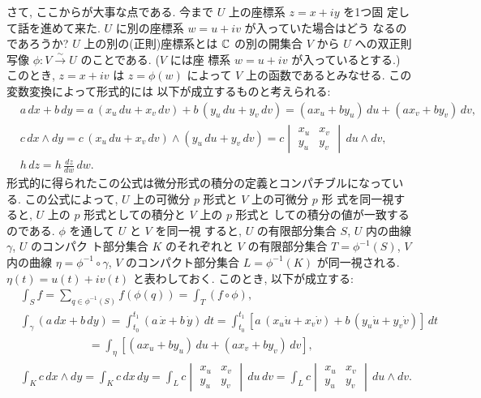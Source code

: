 \documentclass[12pt,twoside]{jarticle}
\def\C{{\Bbb C}} %
\def\isoto{\overset\sim\longrightarrow}
\def\od#1#2{\frac{d #1}{d #2}}
\begin{document}
さて, ここからが大事な点である. 今まで $U$ 上の座標系 $z=x+iy$ を1つ固
定して話を進めて来た. $U$ に別の座標系 $w=u+iv$ が入っていた場合はどう
なるのであろうか? $U$ 上の別の(正則)座標系とは $\C$ の別の開集合 $V$ 
から $U$ への双正則写像 $\phi : V \isoto U$ のことである. ($V$ には座
標系 $w=u+iv$ が入っているとする.) このとき, $z=x+iv$ は $z=\phi(w)$ 
によって $V$ 上の函数であるとみなせる. この変数変換によって形式的には
以下が成立するものと考えられる:
\begin{align*}
  &
  a\,dx+b\,dy
  = a\,(x_u\,du + x_v\,dv) + b\,(y_u\,du + y_v\,dv)
  = (a x_u + b y_u)\, du + (a x_v + b y_v)\,dv,
  \\ &
  c\,dx\wedge dy
  = c\,(x_u\,du + x_v\,dv)\wedge(y_u\,du + y_v\,dv)
  = c \begin{vmatrix}x_u&x_v\\y_u&y_v\end{vmatrix}\,du\wedge dv,
  \\ &
  h\,dz
  = h\,\od{z}{w}\,dw.
\end{align*}
形式的に得られたこの公式は微分形式の積分の定義とコンパチブルになってい
る. この公式によって, $U$ 上の可微分 $p$ 形式と $V$ 上の可微分 $p$ 形
式を同一視すると, $U$ 上の $p$ 形式としての積分と $V$ 上の $p$ 形式と
しての積分の値が一致するのである. $\phi$ を通して $U$ と $V$ を同一視
すると, $U$ の有限部分集合 $S$, $U$ 内の曲線 $\gamma$, $U$ のコンパク
ト部分集合 $K$ のそれぞれと $V$ の有限部分集合 $T=\phi^{-1}(S)$, $V$ 
内の曲線 $\eta=\phi^{-1}\circ\gamma$, $V$ のコンパクト部分集合 %
$L=\phi^{-1}(K)$ が同一視される. $\eta(t)=u(t)+iv(t)$ と表わしておく.
このとき, 以下が成立する:
\begin{align*}
  &
    \int_S f
    = \sum_{q\in\phi^{-1}(S)}f(\phi(q))
    = \int_T (f\circ\phi),
    \qquad
  \\ &
    \int_\gamma (a\,dx+b\,dy)
    = \int_{t_0}^{t_1} (a\,\dot{x} + b\,\dot{y})\,dt
    = \int_{t_0}^{t_1}
      [
        a\,(x_u\dot{u}+x_v\dot{v}) +
        b\,(y_u\dot{u}+y_v\dot{v})
      ]\,dt
  \\ & \qquad\qquad\qquad
    = \int_\eta [(a x_u + b y_u)\, du + (a x_v + b y_v)\,dv],
  \\ &
    \int_K c\,dx\wedge dy
    = \int_K c \,dx\,dy
    = \int_L
      c \begin{vmatrix} x_u & x_v \\ y_u & y_v \end{vmatrix} \,du\,dv
    = \int_L
      c \begin{vmatrix} x_u & x_v \\ y_u & y_v \end{vmatrix} \,du\wedge dv.
\end{align*}
\end{document}
